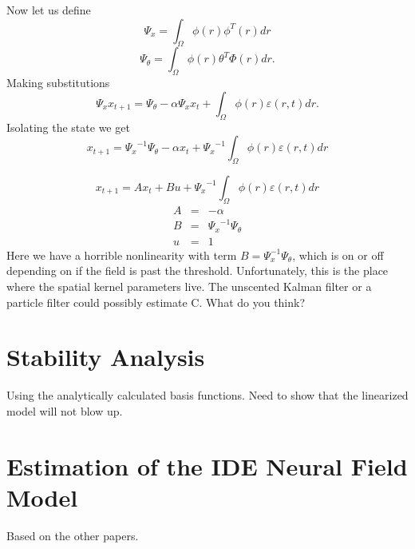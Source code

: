 \documentclass[onecolumn,draftcls]{IEEEtran}
\begin{document}
Now let us define
\begin{equation}\label{DefinePsix}
{\Psi _x} = \int_\Omega  {\phi \left( r \right){\phi ^T}\left( r \right)dr}
\end{equation}
\begin{equation}\label{DefinePsiTheta}
{\Psi _\theta } = \int_\Omega  {\phi \left( r \right){\theta ^T}\Phi \left( r \right)dr}.
\end{equation}
Making substitutions
\begin{equation}\label{poo}
{\Psi _x}{x_{t+1}} = {\Psi _\theta } - \alpha {\Psi _x}{x_t} + \int_\Omega  {\phi \left( r \right)\varepsilon \left( {r,t} \right)dr}.
\end{equation}
Isolating the state we get
\begin{equation}\label{IsolatingState}
{x_{t+1}} = {\Psi _x}^{ - 1}{\Psi _\theta } - \alpha {x_t} + {\Psi _x}^{ - 1}\int_\Omega  {\phi \left( r \right)\varepsilon \left( {r,t} \right)dr}
\end{equation}

\begin{equation}\label{SSmodel}
{x_{t+1}} = A{x_t} + Bu + {\Psi _x}^{ - 1}\int_\Omega  {\phi \left( r \right)\varepsilon \left( {r,t} \right)dr}
\end{equation}
\begin{eqnarray}
  A &=& -\alpha \\
  B &=& {\Psi _x}^{ - 1}{\Psi _\theta } \\
  u &=& 1 
\end{eqnarray}
Here we have a horrible nonlinearity with term $B = \Psi _x^{ - 1}\Psi_\theta$, which is on or off depending on if the field is past the threshold. Unfortunately, this is the place where the spatial kernel parameters live. The unscented Kalman filter or a particle filter could possibly estimate C. What do you think?

\section{Stability Analysis}
Using the analytically calculated basis functions. Need to show that the linearized model will not blow up.

\section{Estimation of the IDE Neural Field Model}
Based on the other papers.
\end{document}
